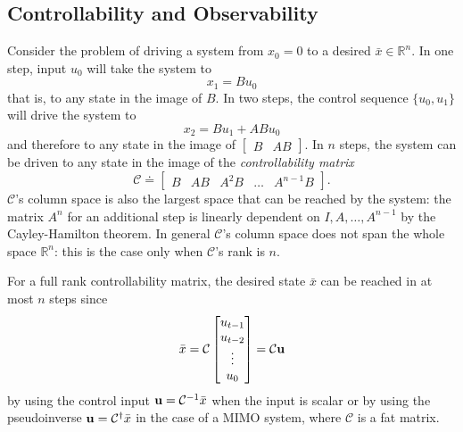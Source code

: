 \subsection{Controllability and Observability}
\label{sec:controllability-observability}

Consider the problem of driving a system from $x_0=0$ to a desired $\bar{x}\in \mathbb{R}^n$. In one step, input $u_0$ will take the system to
\begin{equation*}
  x_1 = Bu_0
\end{equation*}
that is, to any state in the image of $B$. In two steps, the control sequence $\{u_0,u_1\}$ will drive the system to
\begin{equation*}
  x_2 = Bu_1 + ABu_0
\end{equation*}
and therefore to any state in the image of $\begin{bmatrix}B & AB\end{bmatrix}$. In $n$ steps, the system can be driven to any state in the image of the \emph{controllability matrix}
\begin{equation}
  \label{eq:controllability-matrix}
  \mathcal{C} \doteq
  \begin{bmatrix}
    B & AB & A^2B & \ldots & A^{n-1}B
  \end{bmatrix}.
\end{equation}
$\mathcal{C}$'s column space is also the largest space that can be reached by the system: the matrix $A^n$ for an additional step is linearly dependent on $I,A,\ldots, A^{n-1}$ by the Cayley-Hamilton theorem. In general $\mathcal{C}$'s column space does not span the whole space $\mathbb{R}^n$: this is the case only when $\mathcal{C}$'s rank is $n$.

For a full rank controllability matrix, the desired state $\bar{x}$ can be reached in at most $n$ steps since
\begin{equation*}
  \bar{x} = \mathcal{C}
  \begin{bmatrix}
    u_{t-1} \\ u_{t-2} \\ \vdots \\ u_0
  \end{bmatrix} = \mathcal{C} \boldsymbol{\mathrm{u}}
\end{equation*}
by using the control input $\boldsymbol{\mathrm{u}} = \mathcal{C}^{-1}\bar{x}$ when the input is scalar or by using the pseudoinverse $\boldsymbol{\mathrm{u}} = \mathcal{C}^\dagger\bar{x}$ in the case of a MIMO system, where $\mathcal{C}$ is a fat matrix.

